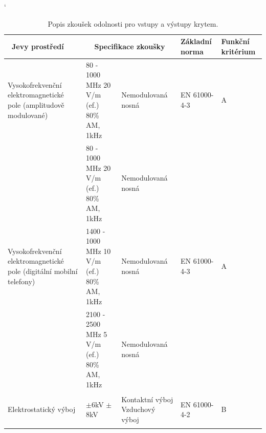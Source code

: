 \begin{table}[!h]
\catcode`
\begin{center}
  	\caption{Popis zkoušek odolnosti pro vstupy a výstupy krytem.}
  	\label{tab:emc_odolnosti1}
\begin{tabular}{|p{}|p{}|p{}|p{}|p{}|}
	\hline
	{\bf\ Jevy prostředí} 	& \multicolumn{2}{c}{\bf Specifikace zkoušky}\vline & {\bf Základní norma} & {\bf Funkční kritérium} \\
	\hline
	\hline
	Vysokofrekvenční elektromagnetické pole (amplitudově modulované) & 80 - 1000 MHz 20 V/m (ef.) 80\% AM, 1kHz & Nemodulovaná nosná	& \begin{center}EN 61000-4-3 		\end{center}& \begin{center} A~\end{center} \\ 
	\hline
	 & 80 - 1000 MHz 20 V/m (ef.) 80\% AM, 1kHz & Nemodulovaná nosná &   &  \\
	\cline{2-3}
	Vysokofrekvenční elektromagnetické pole (digitální mobilní telefony) & 1400 - 1000 MHz 10 V/m (ef.) 80\% AM, 1kHz & Nemodulovaná nosná & 	\begin{center}  EN 61000-4-3  \end{center} & \begin{center} A~\end{center} \\
	\cline{2-3}
	& 2100 - 2500 MHz 5 V/m (ef.) 80\% AM, 1kHz & Nemodulovaná nosná	&  &  \\
	\hline
	Elektrostatický výboj & \begin{center} $\pm$6kV $\pm$8kV \end{center} & Kontaktní výboj \mbox{Vzduchový} výboj &\begin{center}EN 61000-4-2 \end{center} 
	& \begin{center}B\end{center} \\
	\hline
\end{tabular}
\end{center}
\end{table}

